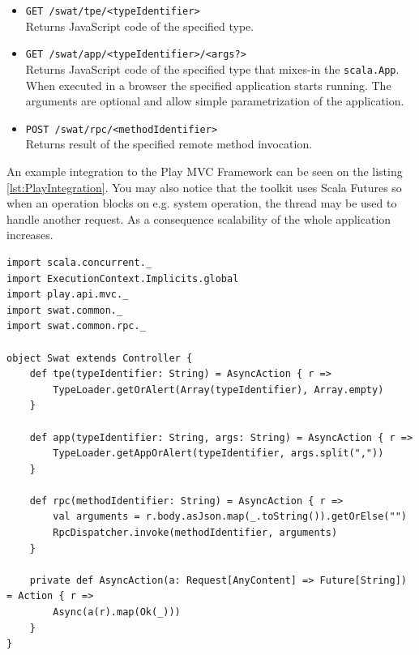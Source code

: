 \documentclass[12pt,a4paper]{report}
\begin{document}
\begin{itemize}
\item \texttt{GET /swat/tpe/<typeIdentifier>}\\
Returns JavaScript code of the specified type.
\item \texttt{GET /swat/app/<typeIdentifier>/<args?>}\\
Returns JavaScript code of the specified type that mixes-in the \texttt{scala.App}. When executed in a browser the specified application starts running. The arguments are optional and allow simple parametrization of the application.
\item \texttt{POST /swat/rpc/<methodIdentifier>}\\
Returns result of the specified remote method invocation.  
\end{itemize}

An example integration to the Play MVC Framework \cite{Play} can be seen on the listing \ref{lst:PlayIntegration}. You may also notice that the toolkit uses Scala Futures \cite{ScalaFutures} so when an operation blocks on e.g. system operation, the thread may be used to handle another request. As a consequence scalability of the whole application increases.

\begin{minipage}{\linewidth}
\begin{lstlisting}[caption={Integration of Swat toolkit to Play Framework.},label={lst:PlayIntegration},basicstyle=\scriptsize\ttfamily]
import scala.concurrent._
import ExecutionContext.Implicits.global
import play.api.mvc._
import swat.common._
import swat.common.rpc._

object Swat extends Controller {
    def tpe(typeIdentifier: String) = AsyncAction { r =>
        TypeLoader.getOrAlert(Array(typeIdentifier), Array.empty)
    }

    def app(typeIdentifier: String, args: String) = AsyncAction { r =>
        TypeLoader.getAppOrAlert(typeIdentifier, args.split(","))
    }

    def rpc(methodIdentifier: String) = AsyncAction { r =>
        val arguments = r.body.asJson.map(_.toString()).getOrElse("")
        RpcDispatcher.invoke(methodIdentifier, arguments)
    }

    private def AsyncAction(a: Request[AnyContent] => Future[String]) = Action { r =>
        Async(a(r).map(Ok(_)))
    }
}
\end{lstlisting}
\end{minipage}
\end{document}
